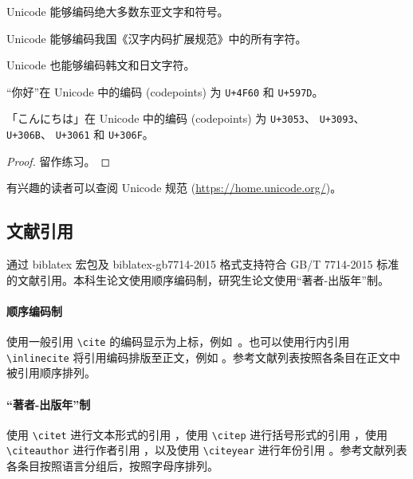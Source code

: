 \documentclass[master]{shtthesis}
\begin{document}
\begin{theorem}
  Unicode 能够编码绝大多数东亚文字和符号。
\end{theorem}

\begin{corollary}
  Unicode 能够编码我国《汉字内码扩展规范》中的所有字符。
\end{corollary}

\begin{corollary}
  Unicode 也能够编码韩文和日文字符。
\end{corollary}

\begin{example}
  “你好”在 Unicode 中的编码 (codepoints) 为 \verb|U+4F60| 和 \verb|U+597D|。
\end{example}

\begin{example}
  「こんにちは」在 Unicode 中的编码 (codepoints) 为 \verb|U+3053|、 \verb|U+3093|、 \verb|U+306B|、 \verb|U+3061| 和 \verb|U+306F|。
\end{example}

\begin{proof}
  留作练习。
\end{proof}

\begin{remark}
  有兴趣的读者可以查阅 Unicode 规范 (\url{https://home.unicode.org/})。
\end{remark}

\subsection{文献引用} \label{sec::citation}
\shtthesis{} 通过 \textsf{biblatex} 宏包及 \textsf{biblatex-gb7714-2015} 格式支持符合 GB/T 7714-2015 标准的文献引用。本科生论文使用顺序编码制，研究生论文使用“著者-出版年”制。

\paragraph{顺序编码制}
使用一般引用 \verb|\cite| 的编码显示为上标，例如~\cite{stamerjohanns2009mathml, yuan2012lana}。也可以使用行内引用 \verb|\inlinecite| 将引用编码排版至正文，例如 。参考文献列表按照各条目在正文中被引用顺序排列。

\paragraph{“著者-出版年”制}
使用 \verb|\citet| 进行文本形式的引用 \citet{Bohan1928}，使用 \verb|\citep| 进行括号形式的引用 \citep{yuan2012lana}，使用 \verb|\citeauthor| 进行作者引用 \citeauthor{niu2013zonghe}，以及使用 \verb|\citeyear| 进行年份引用 \citeyear{walls2013drought}。参考文献列表各条目按照语言分组后，按照字母序排列。
\end{document}
